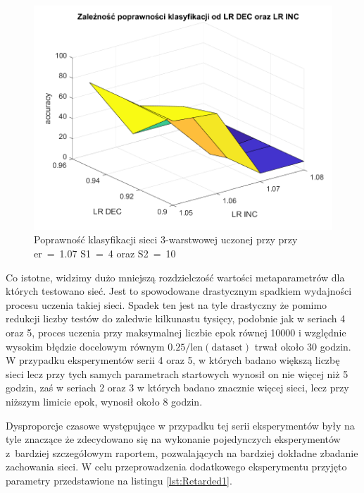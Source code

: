 \documentclass[12pt,twoside]{article}
\begin{document}
\begin{figure}[ht]
	\centering
	\includegraphics[width=16cm]{figures/Retarded_1.png}
	\caption{Poprawność klasyfikacji sieci 3-warstwowej uczonej przy  przy er~=~1.07 S1~=~4 oraz S2~=~10}
	\label{Fig:Retarded1}
\end{figure}
Co istotne, widzimy dużo mniejszą rozdzielczość wartości metaparametrów dla których testowano sieć.
Jest to spowodowane drastycznym spadkiem wydajności procesu uczenia takiej sieci.
Spadek ten jest na tyle drastyczny że pomimo redukcji liczby testów do zaledwie kilkunastu tysięcy, podobnie jak w seriach 4 oraz 5, proces uczenia przy maksymalnej liczbie epok równej 10000 i względnie wysokim błędzie docelowym równym $0.25/\text{len}(\text{dataset})$ trwał około 30 godzin.
W przypadku eksperymentów serii 4 oraz 5, w których badano większą liczbę sieci lecz przy tych samych parametrach startowych wynosił on nie więcej niż 5 godzin, zaś w seriach 2 oraz 3 w których badano znacznie więcej sieci, lecz przy niższym limicie epok, wynosił około 8 godzin.

Dysproporcje czasowe występujące w przypadku tej serii eksperymentów były na tyle znaczące że zdecydowano się na wykonanie pojedynczych eksperymentów z~bardziej szczegółowym raportem, pozwalających na bardziej dokładne zbadanie zachowania sieci.
W celu przeprowadzenia dodatkowego eksperymentu przyjęto parametry przedstawione na listingu \ref{lst:Retarded1}.
\end{document}
